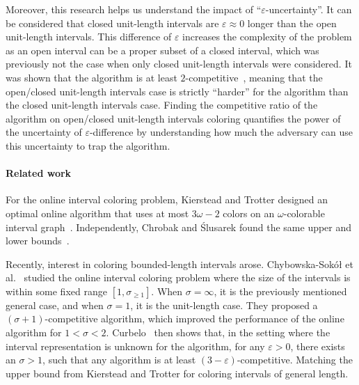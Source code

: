 Moreover, this research helps us understand the impact of ``$\varepsilon$-uncertainty''.
It can be considered that closed unit-length intervals are $\varepsilon \approx 0$ longer than the open unit-length intervals. 
This difference of $\varepsilon$ increases the complexity of the problem as an open interval can be a proper subset of a closed interval, which was previously not the case when only closed unit-length intervals were considered.
It was shown that the \ff algorithm is at least $2$-competitive~\cite{Curbelo}, meaning that the open/closed unit-length intervals case is strictly ``harder'' for the \ff algorithm than the closed unit-length intervals case. 
Finding the competitive ratio of the \ff algorithm on open/closed unit-length intervals coloring quantifies the power of the uncertainty of $\varepsilon$-difference by understanding how much the adversary can use this uncertainty to trap the \ff algorithm.

\paragraph*{Related work} For the online interval coloring problem, Kierstead and Trotter designed an optimal online algorithm that uses at most $3\omega - 2$ colors on an $\omega$-colorable interval graph~\cite{kierstead1981extremal}.
Independently, Chrobak and \'{S}lusarek found the same upper and lower bounds~\cite{DBLP:journals/ita/ChrobakS88, DBLP:conf/mfcs/Slusarek89}.

Recently, interest in coloring bounded-length intervals arose.
Chybowska-Sok\'{o}\l{} et al.~\cite{DBLP:journals/ejc/ChybowskaSokol24} studied the online interval coloring problem where the size of the intervals is within some fixed range $[1, \sigma_{\geq 1}]$.
When $\sigma = \infty$, it is the previously mentioned general case, and when $\sigma = 1$, it is the unit-length case.
They proposed a $(\sigma + 1)$-competitive algorithm, which improved the performance of the online algorithm for $1<\sigma<2$.
Curbelo~\cite{DBLP:journals/corr/abs-2401-05648} then shows that, in the setting where the interval representation is unknown for the algorithm, for any $\varepsilon > 0$, there exists an $\sigma > 1$, such that any algorithm is at least $(3 - \varepsilon)$-competitive. Matching the upper bound from Kierstead and Trotter for coloring intervals of general length.

